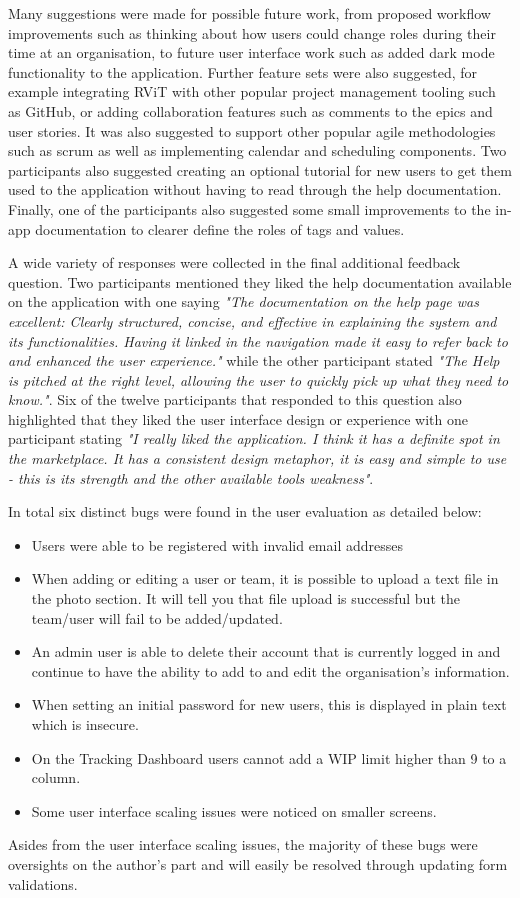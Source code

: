 \documentclass[l4proj.tex]{subfiles}
\begin{document}
Many suggestions were made for possible future work, from proposed workflow improvements such as thinking about how users could change roles during their time at an organisation, to future user interface work such as added dark mode functionality to the application. Further feature sets were also suggested, for example integrating RViT with other popular project management tooling such as GitHub, or adding collaboration features such as comments to the epics and user stories. It was also suggested to support other popular agile methodologies such as scrum as well as implementing calendar and scheduling components. Two participants also suggested creating an optional tutorial for new users to get them used to the application without having to read through the help documentation. Finally, one of the participants also suggested some small improvements to the in-app documentation to clearer define the roles of tags and values.

A wide variety of responses were collected in the final additional feedback question. Two participants mentioned they liked the help documentation available on the application with one saying \textit{"The documentation on the help page was excellent: Clearly structured, concise, and effective in explaining the system and its functionalities. Having it linked in the navigation made it easy to refer back to and enhanced the user experience."} while the other participant stated \textit{"The Help is pitched at the right level, allowing the user to quickly pick up what they need to know."}. Six of the twelve participants that responded to this question also highlighted that they liked the user interface design or experience with one participant stating \textit{"I really liked the application. I think it has a definite spot in the marketplace. It has a consistent design metaphor, it is easy and simple to use - this is its strength and the other available tools weakness"}. 


In total six distinct bugs were found in the user evaluation as detailed below:
\begin{itemize}
    \item Users were able to be registered with invalid email addresses
    \item When adding or editing a user or team, it is possible to upload a text file in the photo section. It will tell you that file upload is successful but the team/user will fail to be added/updated.
    \item An admin user is able to delete their account that is currently logged in and continue to have the ability to add to and edit the organisation's information.
    \item When setting an initial password for new users, this is displayed in plain text which is insecure.
    \item On the Tracking Dashboard users cannot add a WIP limit higher than 9 to a column.
    \item Some user interface scaling issues were noticed on smaller screens.
\end{itemize}
Asides from the user interface scaling issues, the majority of these bugs were oversights on the author's part and will easily be resolved through updating form validations. 
\end{document}

